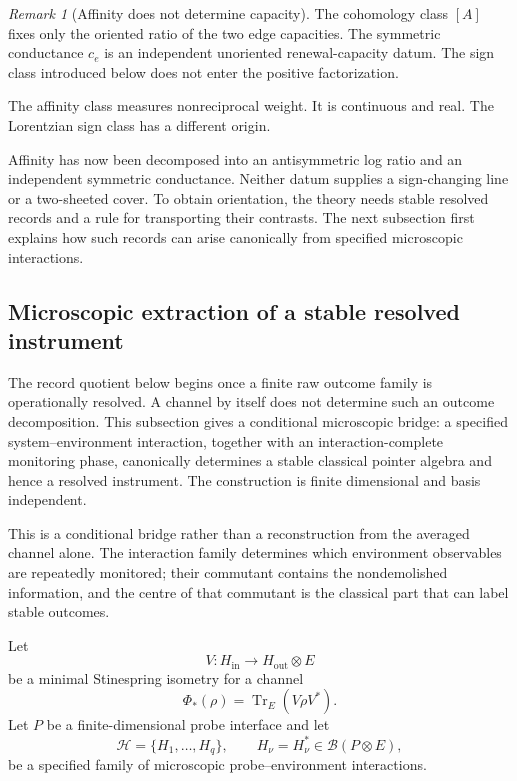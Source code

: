 \documentclass[11pt]{article}
\theoremstyle{definition}
\theoremstyle{remark}
\newtheorem{remark}[theorem]{Remark}
\newcommand{\Tr}{\operatorname{Tr}}
\begin{document}
\begin{remark}[Affinity does not determine capacity]
The cohomology class $[A]$ fixes only the oriented ratio of the two edge
capacities.  The symmetric conductance $c_e$ is an independent unoriented
renewal-capacity datum.  The sign class introduced below does not enter the
positive factorization.
\end{remark}

The affinity class measures nonreciprocal weight.  It is continuous and real.
The Lorentzian sign class has a different origin.


Affinity has now been decomposed into an antisymmetric log ratio and an
independent symmetric conductance.  Neither datum supplies a sign-changing line
or a two-sheeted cover.  To obtain orientation, the theory needs stable resolved
records and a rule for transporting their contrasts.  The next subsection first
explains how such records can arise canonically from specified microscopic
interactions.

\subsection{Microscopic extraction of a stable resolved instrument}
\label{subsec:stable-pointer-instrument}

The record quotient below begins once a finite raw outcome family is
operationally resolved.  A channel by itself does not determine such an
outcome decomposition.  This subsection gives a conditional microscopic
bridge: a specified system--environment interaction, together with an
interaction-complete monitoring phase, canonically determines a stable
classical pointer algebra and hence a resolved instrument.  The construction
is finite dimensional and basis independent.

This is a conditional bridge rather than a reconstruction from the averaged
channel alone.  The interaction family determines which environment observables
are repeatedly monitored; their commutant contains the nondemolished information,
and the centre of that commutant is the classical part that can label stable
outcomes.

Let
\[
 V:H_{\mathrm{in}}\longrightarrow H_{\mathrm{out}}\otimes E
\]
be a minimal Stinespring isometry for a channel
\[
 \Phi_*(\rho)=\Tr_E(V\rho V^*).
\]
Let \(P\) be a finite-dimensional probe interface and let
\[
 \mathscr H=\{H_1,\ldots,H_q\},
 \qquad H_\nu=H_\nu^*\in\mathcal B(P\otimes E),
\]
be a specified family of microscopic probe--environment interactions.
\end{document}
